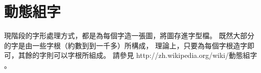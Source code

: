 ﻿
\chapter{動態組字}
現階段的字形處理方式，都是為每個字造一張圖，將圖存進字型檔。
既然大部分的字是由一些字根（約數到到一千多）所構成，
理論上，只要為每個字根造字即可，其餘的字則可以字根所組成。
請參見 http://zh.wikipedia.org/wiki/動態組字 。


